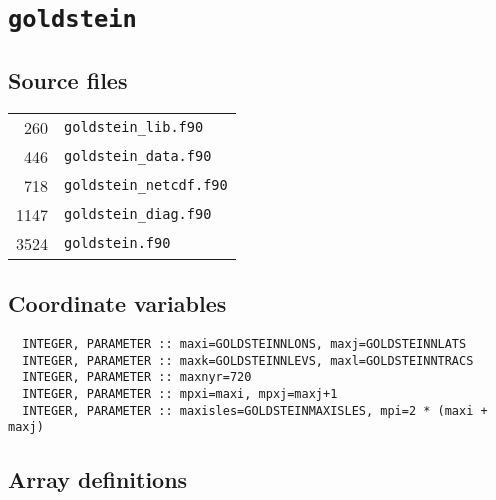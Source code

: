 \documentclass[a4paper,10pt,article]{memoir}
\begin{document}
\chapter{\texttt{goldstein}}

\section{Source files}

\begin{tabular}{rl}
   260 & \texttt{goldstein\_lib.f90} \\
   446 & \texttt{goldstein\_data.f90} \\
   718 & \texttt{goldstein\_netcdf.f90} \\
  1147 & \texttt{goldstein\_diag.f90} \\
  3524 & \texttt{goldstein.f90} \\
\end{tabular}

\section{Coordinate variables}

\begin{verbatim}
  INTEGER, PARAMETER :: maxi=GOLDSTEINNLONS, maxj=GOLDSTEINNLATS
  INTEGER, PARAMETER :: maxk=GOLDSTEINNLEVS, maxl=GOLDSTEINNTRACS
  INTEGER, PARAMETER :: maxnyr=720
  INTEGER, PARAMETER :: mpxi=maxi, mpxj=maxj+1
  INTEGER, PARAMETER :: maxisles=GOLDSTEINMAXISLES, mpi=2 * (maxi + maxj)
\end{verbatim}

\section{Array definitions}
\end{document}
